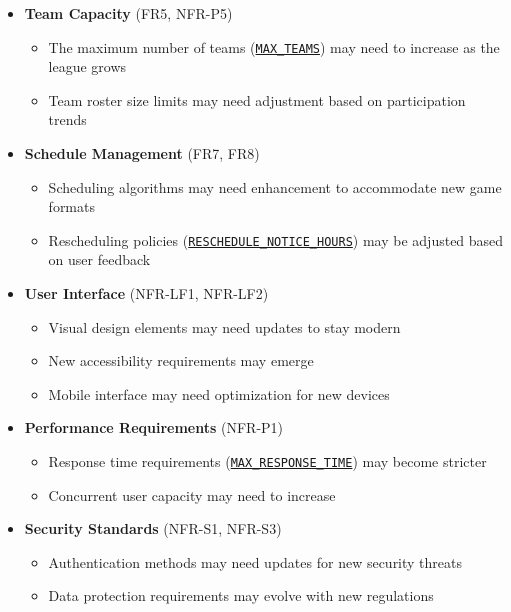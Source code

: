 \documentclass[12pt, titlepage]{article}
\begin{document}
\begin{itemize}
    \item \textbf{Team Capacity} (FR5, NFR-P5)
    \begin{itemize}
        \item The maximum number of teams (\hyperref[MAX_TEAMS]{\texttt{MAX\_TEAMS}}) may need to increase as the league grows
        \item Team roster size limits may need adjustment based on participation trends
    \end{itemize}

    \item \textbf{Schedule Management} (FR7, FR8)
    \begin{itemize}
        \item Scheduling algorithms may need enhancement to accommodate new game formats
        \item Rescheduling policies (\hyperref[RESCHEDULE_NOTICE_HOURS]{\texttt{RESCHEDULE\_NOTICE\_HOURS}}) may be adjusted based on user feedback
    \end{itemize}

    \item \textbf{User Interface} (NFR-LF1, NFR-LF2)
    \begin{itemize}
        \item Visual design elements may need updates to stay modern
        \item New accessibility requirements may emerge
        \item Mobile interface may need optimization for new devices
    \end{itemize}

    \item \textbf{Performance Requirements} (NFR-P1)
    \begin{itemize}
        \item Response time requirements (\hyperref[MAX_RESPONSE_TIME]{\texttt{MAX\_RESPONSE\_TIME}}) may become stricter
        \item Concurrent user capacity may need to increase
    \end{itemize}

    \item \textbf{Security Standards} (NFR-S1, NFR-S3)
    \begin{itemize}
        \item Authentication methods may need updates for new security threats
        \item Data protection requirements may evolve with new regulations
    \end{itemize}
\end{itemize}
\end{document}
